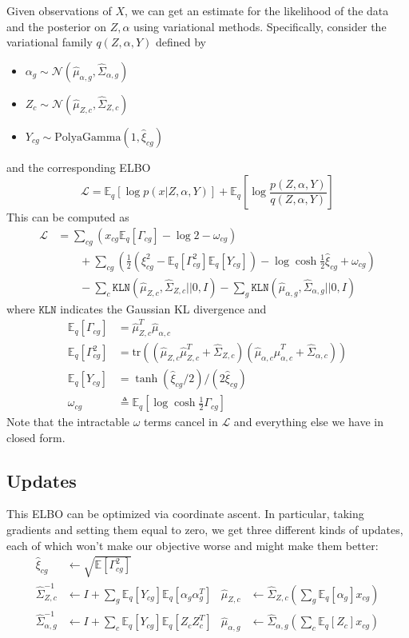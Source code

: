 \documentclass{article}
\begin{document}
Given observations of $X$, we can get an estimate for the likelihood of the data and the posterior on $Z,\alpha$ using variational methods.  Specifically, consider the variational family $q(Z,\alpha,Y)$ defined by
\begin{itemize}
    \item $\alpha_g \sim \mathcal{N}(\hat \mu_{\alpha,g},\hat \Sigma_{\alpha,g})$
    \item $Z_c \sim \mathcal{N}(\hat \mu_{Z,c},\hat \Sigma_{Z,c})$
    \item $Y_{cg} \sim \mathrm{PolyaGamma}(1,\hat \xi_{cg})$
\end{itemize}
and the corresponding ELBO
\[
\mathcal L = \mathbb{E}_q[\log p(x|Z,\alpha,Y)] + \mathbb E_q\left[\log \frac{p(Z,\alpha,Y)}{q(Z,\alpha,Y)}\right]
\]
This can be computed as 
\begin{align*}
\mathcal{L} &= \sum_{cg} \left(x_{cg} \mathbb{E}_q[\Gamma_{cg}] - \log 2 - \omega_{cg}\right) \\
&\qquad + \sum_{cg} \left(\frac{1}{2}(\xi_{cg}^2-\mathbb{E}_q[\Gamma_{cg}^2]\mathbb{E}_q[Y_{cg}]) - \log\cosh \frac{1}{2} \hat \xi_{cg} + \omega_{cg}\right)\\
&\qquad - \sum_{c} \mathtt{KLN}(\hat \mu_{Z,c},\hat \Sigma_{Z,c}||0,I) 
        - \sum_{g} \mathtt{KLN}(\hat \mu_{\alpha,g},\hat \Sigma_{\alpha,g}||0,I)
\end{align*}
where $\mathtt{KLN}$ indicates the Gaussian KL divergence and 
\begin{align*}
\mathbb{E}_q[\Gamma_{cg}]&=\hat \mu_{Z,c}^T\hat \mu_{\alpha,c} \\
\mathbb{E}_q[\Gamma_{cg}^2]&=\mathrm{tr}\left((\hat \mu_{Z,c}\hat \mu_{Z,c}^T + \hat \Sigma_{Z,c})(\hat \mu_{\alpha,c}\hat \mu_{\alpha,c}^T + \hat \Sigma_{\alpha,c})\right) \\
\mathbb{E}_q[Y_{cg}] & = \tanh(\hat \xi_{cg}/2)/(2\hat \xi_{cg})\\
\omega_{cg} & \triangleq \mathbb{E}_q\left[\log \cosh \frac{1}{2} \Gamma_{cg}\right]
\end{align*}
Note that the intractable $\omega$ terms cancel in $\mathcal L$ and everything else we have in closed form.  

\subsection{Updates}

This ELBO can be optimized via coordinate ascent.  In particular, taking gradients and setting them equal to zero, we get three different kinds of updates, each of which won't make our objective worse and might make them better:
\begin{align*}
\hat \xi_{cg} &\gets \sqrt{\mathbb E[\Gamma_{cg}^2]}\\
\hat \Sigma_{Z,c}^{-1} & \gets I+\sum_{g}\mathbb{E}_q[Y_{cg}]\mathbb{E}_q[\alpha_{g}\alpha_{g}^T] &
\hat \mu_{Z,c} & \gets \hat\Sigma_{Z,c} \left(\sum_{g}\mathbb{E}_q[\alpha_g]x_{cg}\right) \\
\hat \Sigma_{\alpha,g}^{-1} & \gets I+\sum_{c}\mathbb{E}_q[Y_{cg}]\mathbb{E}_q[Z_c Z_c^T] &
\hat \mu_{\alpha,g} & \gets \hat\Sigma_{\alpha,g} \left(\sum_{c}\mathbb{E}_q[Z_c]x_{cg}\right) 
\end{align*}
\end{document}
